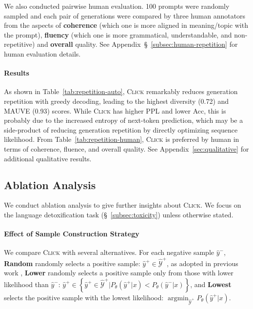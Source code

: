 We also conducted pairwise human evaluation. 100 prompts were randomly sampled and each pair of generations were compared by three human annotators from the aspects of \textbf{coherence} (which one is more aligned in meaning/topic with the prompt), \textbf{fluency} (which one is more grammatical, understandable, and non-repetitive) and \textbf{overall} quality. See Appendix~\S~\ref{subsec:human-repetition} for human evaluation details.

\paragraph{Results}
As shown in Table~\ref{tab:repetition-auto}, \textsc{Click} remarkably reduces generation repetition with greedy decoding, leading to the highest diversity (0.72) and MAUVE (0.93) scores. While \textsc{Click} has higher PPL and lower Acc, this is probably due to the increased entropy of next-token prediction, which may be a side-product of reducing generation repetition by directly optimizing sequence likelihood. From Table~\ref{tab:repetition-human}, \textsc{Click} is preferred by human in terms of coherence, fluence, and overall quality. See Appendix~\ref{sec:qualitative} for additional qualitative results.

\subsection{Ablation Analysis}
\label{subsec:ablation}

We conduct ablation analysis to give further insights about \textsc{Click}.
We focus on the language detoxification task (\S~\ref{subsec:toxicity}) unless otherwise stated.

\paragraph{Effect of Sample Construction Strategy} We compare \textsc{Click} with several alternatives. For each negative sample $\hat{y}^{-}$,
\textbf{Random} randomly selects a positive sample: $\hat{y}^{+} \in \widehat{\mathcal{Y}}^{+}$, as adopted in previous work \cite{brio, slic},
\textbf{Lower} randomly selects a positive sample only from those with lower likelihood than $\hat{y}^{-}$: $\hat{y}^{+} \in \left\{ \hat{y}^{+} \in \widehat{\mathcal{Y}}^{+} | P_{\theta} (\hat{y}^{+} | x) < P_{\theta} (\hat{y}^{-} | x) \right\}$, 
and \textbf{Lowest} selects the positive sample with the lowest likelihood: $\mathop{\arg \min}_{\widehat{\mathcal{Y}}^{+}} P_{\theta} (\hat{y}^{+} | x)$.

